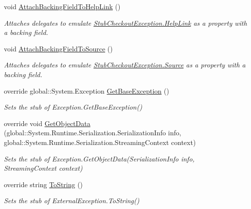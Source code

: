 \begin{DoxyCompactItemize}
void \hyperlink{class_system_1_1_component_model_1_1_design_1_1_fakes_1_1_stub_checkout_exception_a924376f9478527e93fc3f4b2d29913da}{Attach\-Backing\-Field\-To\-Help\-Link} ()
\begin{DoxyCompactList}\small\item\em Attaches delegates to emulate \hyperlink{class_system_1_1_component_model_1_1_design_1_1_fakes_1_1_stub_checkout_exception_ad2222a9bc67ced3e536e6fc227b146c9}{Stub\-Checkout\-Exception.\-Help\-Link} as a property with a backing field.\end{DoxyCompactList}\item 
void \hyperlink{class_system_1_1_component_model_1_1_design_1_1_fakes_1_1_stub_checkout_exception_a62d50accdcb5a67a877272b876b42f91}{Attach\-Backing\-Field\-To\-Source} ()
\begin{DoxyCompactList}\small\item\em Attaches delegates to emulate \hyperlink{class_system_1_1_component_model_1_1_design_1_1_fakes_1_1_stub_checkout_exception_a2a5a22faaf27912906365c56c00705d6}{Stub\-Checkout\-Exception.\-Source} as a property with a backing field.\end{DoxyCompactList}\item 
override global\-::\-System.\-Exception \hyperlink{class_system_1_1_component_model_1_1_design_1_1_fakes_1_1_stub_checkout_exception_a25adae86215105cf7e6ef02d158c16be}{Get\-Base\-Exception} ()
\begin{DoxyCompactList}\small\item\em Sets the stub of Exception.\-Get\-Base\-Exception()\end{DoxyCompactList}\item 
override void \hyperlink{class_system_1_1_component_model_1_1_design_1_1_fakes_1_1_stub_checkout_exception_a10d387e63e9c9be73dac7f8f633b7ce3}{Get\-Object\-Data} (global\-::\-System.\-Runtime.\-Serialization.\-Serialization\-Info info, global\-::\-System.\-Runtime.\-Serialization.\-Streaming\-Context context)
\begin{DoxyCompactList}\small\item\em Sets the stub of Exception.\-Get\-Object\-Data(\-Serialization\-Info info, Streaming\-Context context)\end{DoxyCompactList}\item 
override string \hyperlink{class_system_1_1_component_model_1_1_design_1_1_fakes_1_1_stub_checkout_exception_a3510c7a130da6e6d46219c607958e36d}{To\-String} ()
\begin{DoxyCompactList}\small\item\em Sets the stub of External\-Exception.\-To\-String()\end{DoxyCompactList}\end{DoxyCompactItemize}
